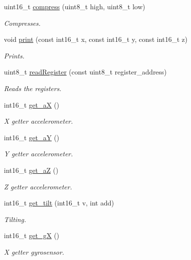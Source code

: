 \begin{DoxyCompactItemize}
uint16\+\_\+t \hyperlink{classMPU6050_a6d5b7dafd96fc69ef489bb00d0964e2d}{compress} (uint8\+\_\+t high, uint8\+\_\+t low)
\begin{DoxyCompactList}\small\item\em Compresses. \end{DoxyCompactList}\item 
void \hyperlink{classMPU6050_aa6a50aeb1ded7185e8730d95e451e87d}{print} (const int16\+\_\+t x, const int16\+\_\+t y, const int16\+\_\+t z)
\begin{DoxyCompactList}\small\item\em Prints. \end{DoxyCompactList}\item 
uint8\+\_\+t \hyperlink{classMPU6050_aa60b939c6eae3e68ea0a161fbcb4d3af}{read\+Register} (const uint8\+\_\+t register\+\_\+address)
\begin{DoxyCompactList}\small\item\em Reads the registers. \end{DoxyCompactList}\item 
int16\+\_\+t \hyperlink{classMPU6050_ad25208622b16528a729e674ca808222b}{get\+\_\+aX} ()
\begin{DoxyCompactList}\small\item\em X getter accelerometer. \end{DoxyCompactList}\item 
int16\+\_\+t \hyperlink{classMPU6050_aedccda658db98a9876415beec8a6537f}{get\+\_\+aY} ()
\begin{DoxyCompactList}\small\item\em Y getter accelerometer. \end{DoxyCompactList}\item 
int16\+\_\+t \hyperlink{classMPU6050_aee0faebb35251e349f1ab29d7bf4e39c}{get\+\_\+aZ} ()
\begin{DoxyCompactList}\small\item\em Z getter accelerometer. \end{DoxyCompactList}\item 
int16\+\_\+t \hyperlink{classMPU6050_ad781cdfd81abb9f0ff9b604b1f7b4bcc}{get\+\_\+tilt} (int16\+\_\+t v, int add)
\begin{DoxyCompactList}\small\item\em Tilting. \end{DoxyCompactList}\item 
int16\+\_\+t \hyperlink{classMPU6050_ac932e75f45e2a4f0511f00953d156e65}{get\+\_\+gX} ()
\begin{DoxyCompactList}\small\item\em X getter gyrosensor. \end{DoxyCompactList}\item 

\end{DoxyCompactItemize}
